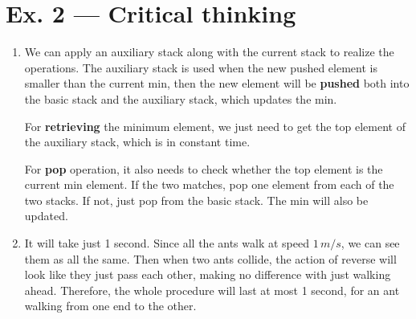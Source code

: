 \documentclass[12pt, a4paper]{article}
\begin{document}
\section*{Ex. 2 --- Critical thinking}
\begin{enumerate}
    \item We can apply an auxiliary stack along with the current stack to realize the operations. The auxiliary stack is used when the new pushed element is smaller than the current min, 
          then the new element will be \textbf{pushed} both into the basic stack and the auxiliary stack, which updates the min. 
          
          For \textbf{retrieving} the minimum element, we just need to get the top element of the auxiliary stack, which is in constant time.

          For \textbf{pop} operation, it also needs to check whether the top element is the current min element. If the two matches, pop one element from each of the two stacks. If not, just pop from the basic stack. The min will also be updated.
    \item It will take just 1 second. Since all the ants walk at speed $1\, m/s$, we can see them as all the same. Then when two ants collide, the action of reverse will look like they just pass each other, making no difference with just walking ahead. 
          Therefore, the whole procedure will last at most 1 second, for an ant walking from one end to the other.
\end{enumerate}
\end{document}
